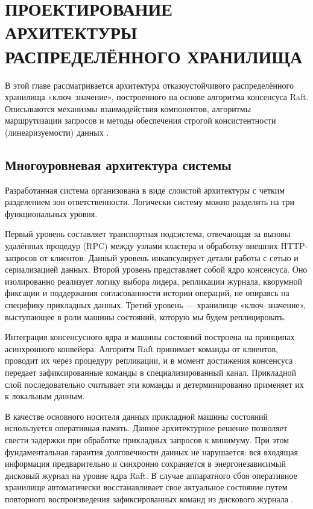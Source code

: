 \chapter{ПРОЕКТИРОВАНИЕ АРХИТЕКТУРЫ РАСПРЕДЕЛЁННОГО ХРАНИЛИЩА}

В этой главе рассматривается архитектура отказоустойчивого распределённого хранилища «ключ--значение», построенного на основе алгоритма консенсуса Raft. Описываются механизмы взаимодействия компонентов, алгоритмы маршрутизации запросов и методы обеспечения строгой консистентности (линеаризуемости) данных \cite{linearizability,raft_original}.

\section{Многоуровневая архитектура системы}

Разработанная система организована в виде слоистой архитектуры с четким разделением зон ответственности. Логически систему можно разделить на три функциональных уровня. 

Первый уровень составляет транспортная подсистема, отвечающая за вызовы удалённых процедур (RPC) между узлами кластера и обработку внешних HTTP-запросов от клиентов. Данный уровень инкапсулирует детали работы с сетью и сериализацией данных.
Второй уровень представляет собой ядро консенсуса. Оно изолированно реализует логику выбора лидера, репликации журнала, кворумной фиксации и поддержания согласованности истории операций, не опираясь на специфику прикладных данных. 
Третий уровень — хранилище «ключ--значение», выступающее в роли машины состояний, которую мы будем реплицировать.

Интеграция консенсусного ядра и машины состояний построена на принципах асинхронного конвейера. Алгоритм Raft принимает команды от клиентов, проводит их через процедуру репликации, и в момент достижения консенсуса передает зафиксированные команды в специализированный канал. Прикладной слой последовательно считывает эти команды и детерминированно применяет их к локальным данным. 

В качестве основного носителя данных прикладной машины состояний используется оперативная память. Данное архитектурное решение позволяет свести задержки при обработке прикладных запросов к минимуму. При этом фундаментальная гарантия долговечности данных не нарушается: вся входящая информация предварительно и синхронно сохраняется в энергонезависимый дисковый журнал на уровне ядра Raft. В случае аппаратного сбоя оперативное хранилище автоматически восстанавливает свое актуальное состояние путем повторного воспроизведения зафиксированных команд из дискового журнала \cite{kleppmann}.

